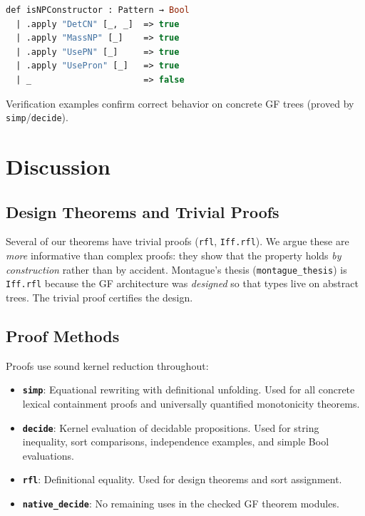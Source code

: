 \documentclass[11pt]{article}
\newcommand{\code}[1]{\texttt{#1}}
\newcommand{\GF}{\textup{GF}}
\begin{document}
\begin{lstlisting}[language=ml,caption={GF NP recognition}]
def isNPConstructor : Pattern → Bool
  | .apply "DetCN" [_, _]  => true
  | .apply "MassNP" [_]    => true
  | .apply "UsePN" [_]     => true
  | .apply "UsePron" [_]   => true
  | _                      => false
\end{lstlisting}

\noindent Verification examples confirm correct behavior on concrete
\GF{} trees (proved by \code{simp}/\code{decide}).

\section{Discussion}
\label{sec:discussion}

\subsection{Design Theorems and Trivial Proofs}

Several of our theorems have trivial proofs (\code{rfl}, \code{Iff.rfl}).
We argue these are \emph{more} informative than complex proofs: they show
that the property holds \emph{by construction} rather than by accident.
Montague's thesis (\code{montague\_thesis}) is \code{Iff.rfl} because the
\GF{} architecture was \emph{designed} so that types live on abstract trees.
The trivial proof certifies the design.

\subsection{Proof Methods}

Proofs use sound kernel reduction throughout:

\begin{itemize}
\item \textbf{\code{simp}}: Equational rewriting with definitional unfolding.
  Used for all concrete lexical containment proofs and universally quantified
  monotonicity theorems.
\item \textbf{\code{decide}}: Kernel evaluation of decidable propositions.
  Used for string inequality, sort comparisons, independence examples, and
  simple Bool evaluations.
\item \textbf{\code{rfl}}: Definitional equality.  Used for design theorems
  and sort assignment.
\item \textbf{\code{native\_decide}}: No remaining uses in the checked
  \GF{} theorem modules.
\end{itemize}
\end{document}
